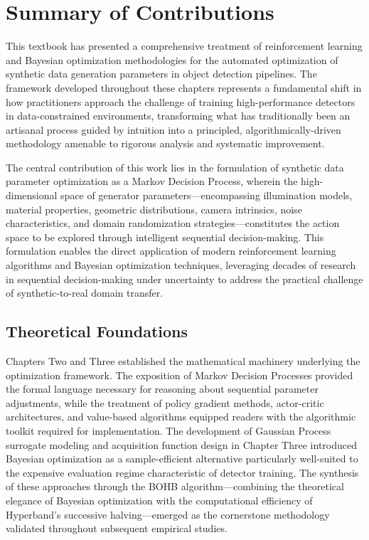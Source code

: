 
\section{Summary of Contributions}
\label{sec:contributions}

This textbook has presented a comprehensive treatment of reinforcement learning and Bayesian optimization methodologies for the automated optimization of synthetic data generation parameters in object detection pipelines. The framework developed throughout these chapters represents a fundamental shift in how practitioners approach the challenge of training high-performance detectors in data-constrained environments, transforming what has traditionally been an artisanal process guided by intuition into a principled, algorithmically-driven methodology amenable to rigorous analysis and systematic improvement.

The central contribution of this work lies in the formulation of synthetic data parameter optimization as a Markov Decision Process, wherein the high-dimensional space of generator parameters---encompassing illumination models, material properties, geometric distributions, camera intrinsics, noise characteristics, and domain randomization strategies---constitutes the action space to be explored through intelligent sequential decision-making. This formulation enables the direct application of modern reinforcement learning algorithms and Bayesian optimization techniques, leveraging decades of research in sequential decision-making under uncertainty to address the practical challenge of synthetic-to-real domain transfer.

\subsection{Theoretical Foundations}
\label{subsec:theoretical_foundations}

Chapters Two and Three established the mathematical machinery underlying the optimization framework. The exposition of Markov Decision Processes provided the formal language necessary for reasoning about sequential parameter adjustments, while the treatment of policy gradient methods, actor-critic architectures, and value-based algorithms equipped readers with the algorithmic toolkit required for implementation. The development of Gaussian Process surrogate modeling and acquisition function design in Chapter Three introduced Bayesian optimization as a sample-efficient alternative particularly well-suited to the expensive evaluation regime characteristic of detector training. The synthesis of these approaches through the BOHB algorithm---combining the theoretical elegance of Bayesian optimization with the computational efficiency of Hyperband's successive halving---emerged as the cornerstone methodology validated throughout subsequent empirical studies.

